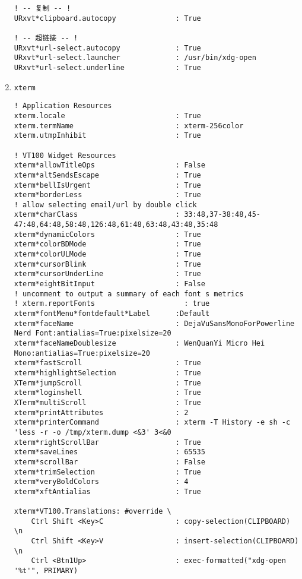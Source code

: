\documentclass[11pt]{article}
\begin{document}
\begin{enumerate}
\begin{lstlisting}
! -- 复制 -- !
URxvt*clipboard.autocopy              : True

! -- 超链接 -- !
URxvt*url-select.autocopy             : True
URxvt*url-select.launcher             : /usr/bin/xdg-open
URxvt*url-select.underline            : True
\end{lstlisting}

\item \texttt{xterm}
\label{sec:org562ea2f}

\lstset{language=conf-xdefaults,label= ,caption= ,captionpos=b,numbers=none}
\begin{lstlisting}
! Application Resources
xterm.locale                          : True
xterm.termName                        : xterm-256color
xterm.utmpInhibit                     : True

! VT100 Widget Resources
xterm*allowTitleOps                   : False
xterm*altSendsEscape                  : True
xterm*bellIsUrgent                    : True
xterm*borderLess                      : True
! allow selecting email/url by double click
xterm*charClass                       : 33:48,37-38:48,45-47:48,64:48,58:48,126:48,61:48,63:48,43:48,35:48
xterm*dynamicColors                   : True
xterm*colorBDMode                     : True
xterm*colorULMode                     : True
xterm*cursorBlink                     : True
xterm*cursorUnderLine                 : True
xterm*eightBitInput                   : False
! uncomment to output a summary of each font s metrics
! xterm.reportFonts                     : true
xterm*fontMenu*fontdefault*Label      :Default
xterm*faceName                        : DejaVuSansMonoForPowerline Nerd Font:antialias=True:pixelsize=20
xterm*faceNameDoublesize              : WenQuanYi Micro Hei Mono:antialias=True:pixelsize=20
xterm*fastScroll                      : True
xterm*highlightSelection              : True
XTerm*jumpScroll                      : True
xterm*loginshell                      : True
XTerm*multiScroll                     : True
xterm*printAttributes                 : 2
xterm*printerCommand                  : xterm -T History -e sh -c 'less -r -o /tmp/xterm.dump <&3' 3<&0
xterm*rightScrollBar                  : True
xterm*saveLines                       : 65535
xterm*scrollBar                       : False
xterm*trimSelection                   : True
xterm*veryBoldColors                  : 4
xterm*xftAntialias                    : True

xterm*VT100.Translations: #override \
    Ctrl Shift <Key>C                 : copy-selection(CLIPBOARD) \n
    Ctrl Shift <Key>V                 : insert-selection(CLIPBOARD) \n
    Ctrl <Btn1Up>                     : exec-formatted("xdg-open '%t'", PRIMARY)
\end{lstlisting}


\end{enumerate}
\end{document}
